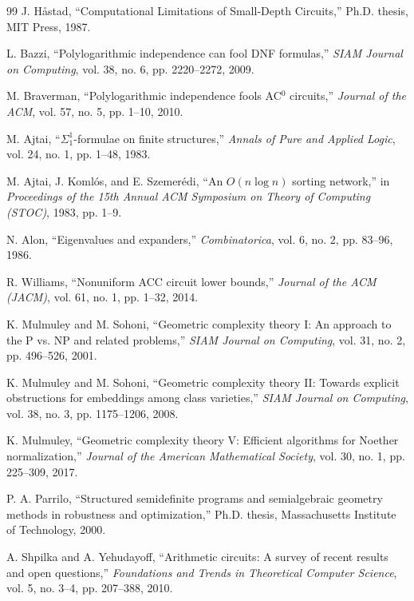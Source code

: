 \documentclass[12pt]{article}
\theoremstyle{definition}
\theoremstyle{definition}
\theoremstyle{remark}
\theoremstyle{remark}
\begin{document}
\begin{thebibliography}{99}
J. H\aa stad, ``Computational Limitations of Small-Depth Circuits,'' Ph.D. thesis, MIT Press, 1987.

L. Bazzi, ``Polylogarithmic independence can fool DNF formulas,'' \emph{SIAM Journal on Computing}, vol. 38, no. 6, pp. 2220--2272, 2009.

M. Braverman, ``Polylogarithmic independence fools AC$^0$ circuits,'' \emph{Journal of the ACM}, vol. 57, no. 5, pp. 1--10, 2010.

M. Ajtai, ``$\Sigma^1_1$-formulae on finite structures,'' \emph{Annals of Pure and Applied Logic}, vol. 24, no. 1, pp. 1--48, 1983.

M. Ajtai, J. Koml\'os, and E. Szemer\'edi, ``An $O(n \log n)$ sorting network,'' in \emph{Proceedings of the 15th Annual ACM Symposium on Theory of Computing (STOC)}, 1983, pp. 1--9.

N. Alon, ``Eigenvalues and expanders,'' \emph{Combinatorica}, vol. 6, no. 2, pp. 83--96, 1986.

R. Williams, ``Nonuniform ACC circuit lower bounds,'' \emph{Journal of the ACM (JACM)}, vol. 61, no. 1, pp. 1--32, 2014.

K. Mulmuley and M. Sohoni, ``Geometric complexity theory I: An approach to the P vs. NP and related problems,'' \emph{SIAM Journal on Computing}, vol. 31, no. 2, pp. 496--526, 2001.

K. Mulmuley and M. Sohoni, ``Geometric complexity theory II: Towards explicit obstructions for embeddings among class varieties,'' \emph{SIAM Journal on Computing}, vol. 38, no. 3, pp. 1175--1206, 2008.

K. Mulmuley, ``Geometric complexity theory V: Efficient algorithms for Noether normalization,'' \emph{Journal of the American Mathematical Society}, vol. 30, no. 1, pp. 225--309, 2017.

P. A. Parrilo, ``Structured semidefinite programs and semialgebraic geometry methods in robustness and optimization,'' Ph.D. thesis, Massachusetts Institute of Technology, 2000.

A. Shpilka and A. Yehudayoff, ``Arithmetic circuits: A survey of recent results and open questions,'' \emph{Foundations and Trends in Theoretical Computer Science}, vol. 5, no. 3--4, pp. 207--388, 2010.


\end{thebibliography}
\end{document}
